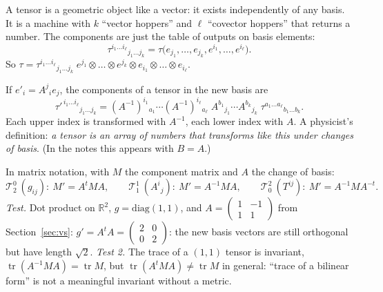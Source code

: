 \documentclass[11pt,a4paper]{article}
\numberwithin{equation}{section}
\theoremstyle{definition}
\theoremstyle{plain}
\newcommand{\R}{\mathbb{R}}
\newcommand{\tr}{\operatorname{tr}}
\newcommand{\TT}[2]{\mathcal{T}^{#1}_{#2}}          %
\begin{document}
\begin{intuition}
A tensor is a geometric object like a vector: it exists independently of any basis. It is a machine with $k$ ``vector hoppers'' and $\ell$ ``covector hoppers'' that returns a number. The components are just the table of outputs on basis elements:
\[
\tau^{i_1\dots i_\ell}{}_{j_1\dots j_k}=\tau\big(e_{j_1},\dots,e_{j_k},e^{i_1},\dots,e^{i_\ell}\big).
\]
So $\tau=\tau^{i_1\dots i_\ell}{}_{j_1\dots j_k}\;e^{j_1}\otimes\dots\otimes e^{j_k}\otimes e_{i_1}\otimes\dots\otimes e_{i_\ell}$.
\end{intuition}

\begin{formal}
If $e'_i=A^j{}_ie_j$, the components of a tensor in the new basis are
\begin{equation}\label{eq:tensortransf}
\tau'^{\,i_1\dots i_\ell}{}_{j_1\dots j_k}=(A^{-1})^{i_1}{}_{a_1}\cdots(A^{-1})^{i_\ell}{}_{a_\ell}\;A^{b_1}{}_{j_1}\cdots A^{b_k}{}_{j_k}\;\tau^{a_1\dots a_\ell}{}_{b_1\dots b_k}.
\end{equation}
Each upper index is transformed with $A^{-1}$, each lower index with $A$. A physicist's definition: \emph{a tensor is an array of numbers that transforms like this under changes of basis}. (In the notes this appears with $B=A$.)
\end{formal}

\begin{example}
In matrix notation, with $M$ the component matrix and $A$ the change of basis:
\[
\TT{0}{2}\ (g_{ij}):\ M'=A^tMA,\qquad
\TT{1}{1}\ (A^i{}_j):\ M'=A^{-1}MA,\qquad
\TT{2}{0}\ (T^{ij}):\ M'=A^{-1}M A^{-t}.
\]
\emph{Test.} Dot product on $\R^2$, $g=\mathrm{diag}(1,1)$, and $A=\begin{pmatrix}1&-1\\1&1\end{pmatrix}$ from Section~\ref{sec:vs}: $g'=A^tA=\begin{pmatrix}2&0\\0&2\end{pmatrix}$: the new basis vectors are still orthogonal but have length $\sqrt2$. \emph{Test 2.} The trace of a $(1,1)$ tensor is invariant, $\tr(A^{-1}MA)=\tr M$, but $\tr(A^tMA)\neq\tr M$ in general: ``trace of a bilinear form'' is not a meaningful invariant without a metric.
\end{example}
\end{document}
